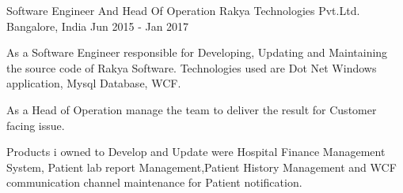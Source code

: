 \begin{cventries}
  \cventry
    {Software Engineer And Head Of Operation} %
    {Rakya Technologies Pvt.Ltd.} %
    {Bangalore, India} %
    {Jun 2015 - Jan 2017} %
    {
      \begin{cvitems} %
        \item {As a Software Engineer responsible for Developing, Updating and Maintaining the source code of Rakya Software. Technologies used are Dot Net Windows application, Mysql Database, WCF.}
  \item {As a Head of Operation manage the team to deliver the result for Customer facing issue.}
  \item {Products i owned to Develop and Update were Hospital Finance Management System, Patient lab report Management,Patient History Management and WCF communication channel maintenance for Patient notification.}
      \end{cvitems}
    }


\end{cventries}
